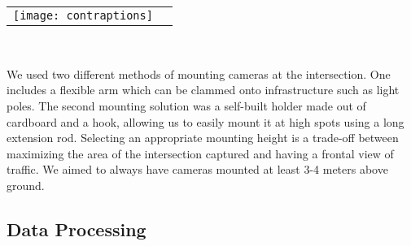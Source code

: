 \ \\





\ \\ 
\raggedbottom
\begin{tabular}{@{}cc}
\texttt{[image: contraptions]}
\end{tabular}
\label{camera_mouns}
\

We used two different methods of mounting cameras at the intersection. One includes a flexible arm which can be clammed onto infrastructure such as light poles.
The second mounting solution was a self-built holder made out of cardboard and a hook, allowing us to easily mount it at high spots using a long extension rod.
Selecting an appropriate mounting height is a trade-off between maximizing the area of the intersection captured and having a frontal view of traffic.
We aimed to always have cameras mounted at least 3-4 meters above ground.

\subsection{Data Processing}
\ \\ 

